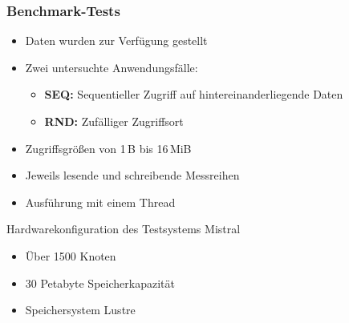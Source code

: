 \documentclass{beamer}
\begin{document}
\begin{frame}
\frametitle{Benchmark-Tests}
\begin{itemize}
	\item Daten wurden zur Verfügung gestellt
	\item Zwei untersuchte Anwendungsfälle:
	\begin{itemize}
		\item \textbf{SEQ:} Sequentieller Zugriff auf hintereinanderliegende Daten
		\item \textbf{RND:} Zufälliger Zugriffsort 
	\end{itemize}
	\item Zugriffsgrößen von 1\,B bis 16\,MiB
	\item Jeweils lesende und schreibende Messreihen
	\item Ausführung mit einem Thread
	
\end{itemize}
	\begin{block}{Hardwarekonfiguration des Testsystems Mistral}
	\begin{itemize} 
		\item Über 1500 Knoten
		\item 30 Petabyte Speicherkapazität
		\item Speichersystem Lustre
	\end{itemize}
\end{block}
\end{frame}
\end{document}

